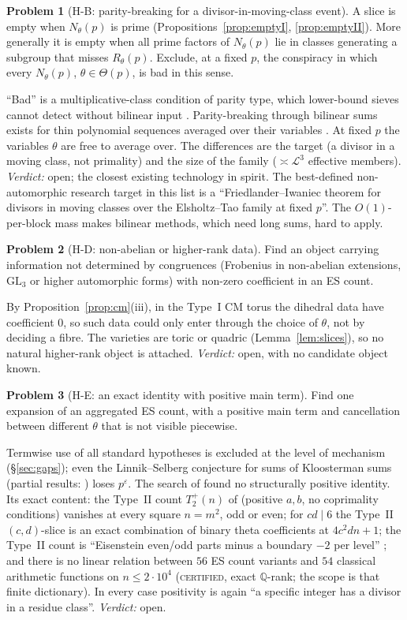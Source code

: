 \documentclass[10pt,reqno]{amsart}
\theoremstyle{definition}
\newtheorem{problem}{Problem}
\numberwithin{equation}{section}
\newcommand{\Q}{\mathbb Q}
\newcommand{\cL}{\mathcal L}
\newcommand{\status}[1]{\textup{\textsc{#1}}}
\begin{document}
\begin{problem}[H-B: parity-breaking for a divisor-in-moving-class event]
A slice is empty when $N_\theta(p)$ is prime
(Propositions~\ref{prop:emptyI}, \ref{prop:emptyII}). More generally it is
empty when all prime factors of $N_\theta(p)$ lie in classes generating a
subgroup that misses $R_\theta(p)$. Exclude, at a fixed $p$, the conspiracy
in which every $N_\theta(p)$, $\theta\in\Theta(p)$, is bad in this sense.
\end{problem}
``Bad'' is a multiplicative-class condition of parity type, which
lower-bound sieves cannot detect without bilinear input \cite[ch.~16]{FI}.
Parity-breaking through bilinear sums exists for thin polynomial sequences
averaged over their variables \cite{FI98,HB,Ma}. At fixed $p$ the variables
$\theta$ are free to average over. The differences are the target (a divisor
in a moving class, not primality) and the size of the family ($\asymp\cL^3$
effective members). \emph{Verdict:} open; the closest existing technology in
spirit. The best-defined non-automorphic research target in this list is
a ``Friedlander--Iwaniec theorem for divisors in moving classes over the
Elsholtz--Tao family at fixed $p$''. The $O(1)$-per-block mass makes
bilinear methods, which need long sums, hard to apply.

\begin{problem}[H-D: non-abelian or higher-rank data]
Find an object carrying information not determined by congruences
(Frobenius in non-abelian extensions, $\mathrm{GL}_3$ or higher automorphic
forms) with non-zero coefficient in an ES count.
\end{problem}
By Proposition~\ref{prop:cm}(iii), in the Type~I CM torus the dihedral data
have coefficient $0$, so such data could only enter through the choice of
$\theta$, not by deciding a fibre. The varieties are toric or quadric
(Lemma~\ref{lem:slices}), so no natural higher-rank object is attached.
\emph{Verdict:} open, with no candidate object known.

\begin{problem}[H-E: an exact identity with positive main term]
Find one expansion of an aggregated ES count, with a positive main term
and cancellation between different $\theta$ that is not visible
piecewise.
\end{problem}
Termwise use of all standard hypotheses is excluded at the level of
mechanism (\S\ref{sec:gaps}); even the Linnik--Selberg conjecture for sums of
Kloosterman sums (partial results: \cite{ST}) loses $p^\varepsilon$. The
search of \cite{O131} found no structurally positive identity. Its exact
content: the Type~II count $T_2^+(n)$ of \cite{O131} (positive $a,b$, no
coprimality conditions) vanishes at every square $n=m^2$, odd or even; for $cd\mid6$ the Type~II
$(c,d)$-slice is an exact combination of binary theta coefficients at
$4c^2dn+1$; the Type~II count is ``Eisenstein even/odd parts minus a
boundary $-2$ per level'' \cite[Prop.~4.1]{O131}; and there is no linear
relation between $56$ ES count variants and $54$ classical arithmetic
functions on $n\le2\cdot10^4$ (\status{certified}, exact $\Q$-rank; the
scope is that finite dictionary). In every case positivity is again ``a
specific integer has a divisor in a residue class''. \emph{Verdict:} open.
\end{document}
